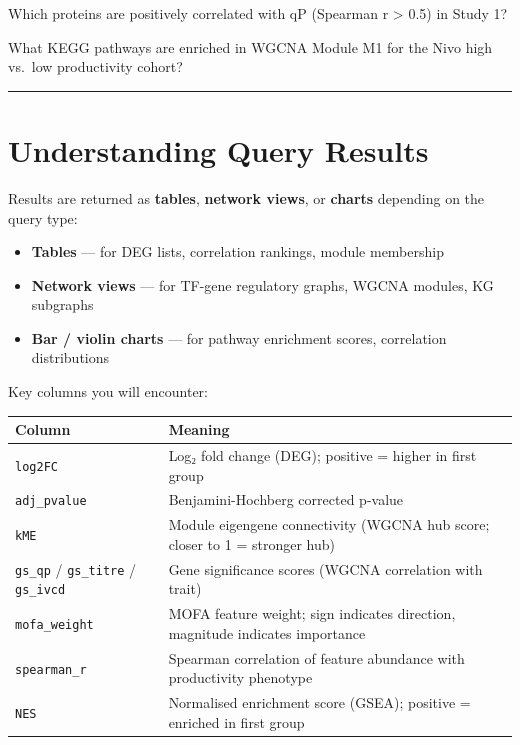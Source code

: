 \documentclass[
  letterpaper,
  oneside,
  open=any]{scrbook}
\newcounter{none} %
\providecommand{\tightlist}{%
  \setlength{\itemsep}{0pt}\setlength{\parskip}{0pt}}
\begin{document}
Which proteins are positively correlated with qP (Spearman r
\textgreater{} 0.5) in Study 1?

What KEGG pathways are enriched in WGCNA Module M1 for the Nivo high
vs.~low productivity cohort?

\begin{center}\rule{0.5\linewidth}{0.5pt}\end{center}

\section{Understanding Query Results}\label{understanding-query-results}

Results are returned as \textbf{tables}, \textbf{network views}, or
\textbf{charts} depending on the query type:

\begin{itemize}
\tightlist
\item
  \textbf{Tables} --- for DEG lists, correlation rankings, module
  membership
\item
  \textbf{Network views} --- for TF-gene regulatory graphs, WGCNA
  modules, KG subgraphs
\item
  \textbf{Bar / violin charts} --- for pathway enrichment scores,
  correlation distributions
\end{itemize}

Key columns you will encounter:

{\def\LTcaptype{none} %
\begin{longtable}[]{@{}
  >{\raggedright\arraybackslash}p{}
  >{\raggedright\arraybackslash}p{}@{}}
\toprule\noalign{}
\begin{minipage}[b]{\linewidth}\raggedright
Column
\end{minipage} & \begin{minipage}[b]{\linewidth}\raggedright
Meaning
\end{minipage} \\
\midrule\noalign{}
\endhead
\bottomrule\noalign{}
\endlastfoot
\texttt{log2FC} & Log₂ fold change (DEG); positive = higher in first
group \\
\texttt{adj\_pvalue} & Benjamini-Hochberg corrected p-value \\
\texttt{kME} & Module eigengene connectivity (WGCNA hub score; closer to
1 = stronger hub) \\
\texttt{gs\_qp} / \texttt{gs\_titre} / \texttt{gs\_ivcd} & Gene
significance scores (WGCNA correlation with trait) \\
\texttt{mofa\_weight} & MOFA feature weight; sign indicates direction,
magnitude indicates importance \\
\texttt{spearman\_r} & Spearman correlation of feature abundance with
productivity phenotype \\
\texttt{NES} & Normalised enrichment score (GSEA); positive = enriched
in first group \\
\end{longtable}
}
\end{document}

